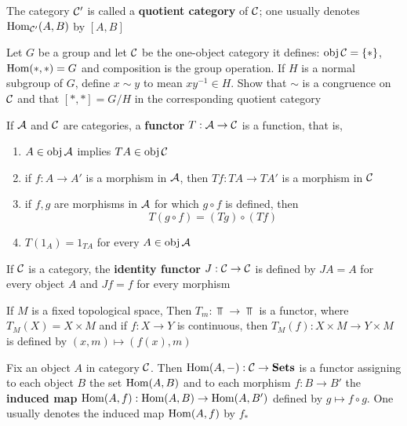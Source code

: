 \documentclass[11pt]{article}
\begin{document}
The category \(\mathcal{C}'\) is called a \textbf{quotient category} of \(\mathcal{C}\); one usually
denotes \(\operatorname{Hom}_{\mathcal{C}'}(A,B)\) by \([A,B]\)

\begin{exercise}
\label{ex0.14}
Let \(G\) be a group and let \(\mathcal{C}\) be the one-object category it
defines: \(\operatorname{obj}\mathcal{C}=\{*\}\), \(\operatorname{Hom}( *, *)=G\) and composition is the group operation. If \(H\) is a
normal subgroup of \(G\), define \(x\sim y\) to mean \(xy^{-1}\in H\). Show that \(\sim\) is a congruence
on \(\mathcal{C}\) and that \([*, *]=G/H\) in the corresponding quotient category
\end{exercise}

\begin{definition}[]
If \(\mathcal{A}\) and \(\mathcal{C}\) are categories, a \textbf{functor} \(T:\mathcal{A}\to\mathcal{C}\) is a function, that is,
\begin{enumerate}
\item \(A\in\operatorname{obj}\mathcal{A}\) implies \(TA\in\operatorname{obj}\mathcal{C}\)
\item if \(f:A\to A'\) is a morphism in \(\mathcal{A}\), then \(Tf:TA\to TA'\) is a morphism in \(\mathcal{C}\)
\item if \(f,g\) are morphisms in \(\mathcal{A}\) for which \(g\circ f\) is defined, then
\begin{equation*}
T(g\circ f)=(Tg)\circ (Tf)
\end{equation*}
\item \(T(1_A)=1_{TA}\) for every \(A\in\operatorname{obj}\mathcal{A}\)
\end{enumerate}
\end{definition}

\begin{examplle}[]
If \(\mathcal{C}\) is a category, the \textbf{identity functor} \(J:\mathcal{C}\to\mathcal{C}\) is defined by \(JA=A\) for every
object \(A\) and \(Jf=f\) for every morphism
\end{examplle}

\begin{examplle}[]
If \(M\) is a fixed topological space, Then \(T_m:\Top\to\Top\) is a functor,
where \(T_M(X)=X\times M\) and if \(f:X\to Y\) is continuous, then \(T_M(f):X\times M\to Y\times M\) is defined by
\((x,m)\mapsto(f(x),m)\)
\end{examplle}

\begin{examplle}[]
Fix an object \(A\) in category \(\mathcal{C}\). Then \(\operatorname{Hom}(A,-):\mathcal{C}\to\operatorname{\textbf{Sets}}\) is a functor assigning to each
object \(B\) the set \(\operatorname{Hom}(A,B)\) and to each morphism \(f:B\to B'\) the \textbf{induced
map} \(\operatorname{Hom}(A,f):\operatorname{Hom}(A,B)\to\operatorname{Hom}(A,B')\) defined by \(g\mapsto f\circ g\). One usually denotes the induced
map \(\operatorname{Hom}(A,f)\) by \(f_*\)
\end{examplle}
\end{document}
